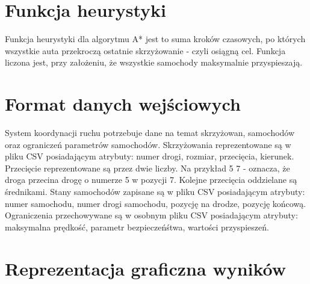 \section{Funkcja heurystyki}

Funkcja heurystyki dla algorytmu A* jest to suma kroków czasowych, po których wszystkie auta przekroczą ostatnie skrzyżowanie - czyli osiągną cel. Funkcja liczona jest, przy założeniu, że wszystkie samochody maksymalnie przyspieszają.

\section{Format danych wejściowych}

System koordynacji ruchu potrzebuje dane na temat skrzyżowan, samochodów oraz ograniczeń parametrów samochodów.
\newline
\newline
Skrzyżowania reprezentowane są w pliku CSV posiadającym atrybuty: numer drogi, rozmiar, przecięcia, kierunek. Przecięcie reprezentowane są przez dwie liczby. Na przykład 5 7 - oznacza, że droga przecina drogę o numerze 5 w pozycji 7. Kolejne przecięcia oddzielane są średnikami.
\newline
\newline
Stany samochodów zapisane są w pliku CSV posiadającym atrybuty: numer samochodu, numer drogi samochodu, pozycję na drodze, pozycję końcową.
\newline
\newline
Ograniczenia przechowywane są w osobnym pliku CSV posiadającym atrybuty: maksymalna prędkość, parametr bezpieczeńśtwa, wartości przyspieszeń.

\section{Reprezentacja graficzna wyników}

